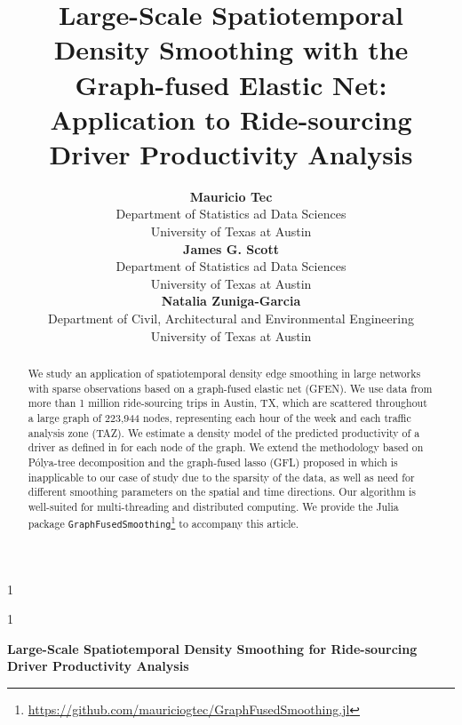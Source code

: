\documentclass[11pt]{article}
\newcommand{\blind}{1}
\begin{document}

\blind
{
  \title{\bf Large-Scale Spatiotemporal Density Smoothing with the Graph-fused Elastic Net: Application to Ride-sourcing Driver Productivity Analysis}
  \author{\textbf{Mauricio Tec}\\
    Department of Statistics ad Data Sciences\\ University of Texas at Austin \vspace{.1cm} \\ 
    \textbf{James G. Scott}\\
    Department of Statistics ad Data Sciences\\ University of Texas at Austin \vspace{.1cm} \\
    \textbf{Natalia Zuniga-Garcia} \\
    Department of Civil, Architectural and Environmental Engineering \\
    University of Texas at Austin}
  \maketitle
} \fi

\blind
{
  \bigskip
  \bigskip
  \bigskip
  \begin{center}
    {\LARGE\bf Large-Scale Spatiotemporal Density Smoothing for Ride-sourcing Driver Productivity Analysis}
\end{center}
  \medskip
} \fi

\bigskip
\begin{abstract}
We study an application of spatiotemporal density edge smoothing in large networks with sparse observations based on a graph-fused elastic net (GFEN). We use data from more than 1 million ride-sourcing trips in Austin, TX, which are scattered throughout a large graph of 223,944 nodes, representing each hour of the week and each traffic analysis zone (TAZ). We estimate a density model of the predicted productivity of a driver as defined in \citep{zuniga-etal-2018} for each node of the graph. We extend the methodology based on Pólya-tree decomposition and the graph-fused lasso (GFL) proposed in \citep{tansey-etal-2017} which is inapplicable to our case of study due to the sparsity of the data, as well as need for different smoothing parameters on the spatial and time directions. Our algorithm is well-suited for multi-threading and distributed computing. We provide the Julia package \texttt{GraphFusedSmoothing}\footnote{\url{https://github.com/mauriciogtec/GraphFusedSmoothing.jl}} to accompany this article.
\end{abstract}
\end{document}
